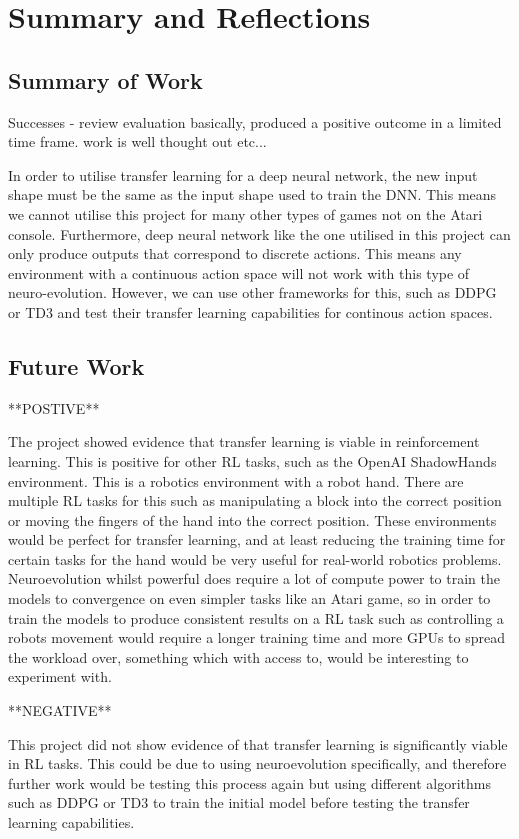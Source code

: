 \chapter{Summary and Reflections}

\label{ch:summary}

\section{Summary of Work}

Successes - review evaluation basically, produced a positive outcome in a limited time frame. work is well thought out etc...


In order to utilise transfer learning for a deep neural network, the new input shape must be the same as the input shape used to train the DNN. This means we cannot utilise this project for many other types of games not on the Atari console. Furthermore, deep neural network like the one utilised in this project can only produce outputs that correspond to discrete actions. This means any environment with a continuous action space will not work with this type of neuro-evolution. However, we can use other frameworks for this, such as DDPG or TD3 and test their transfer learning capabilities for continous action spaces.

\section{Future Work}

**POSTIVE**

The project showed evidence that transfer learning is viable in reinforcement learning. This is positive for other RL tasks, such as the OpenAI ShadowHands environment. This is a robotics environment with a robot hand. There are multiple RL tasks for this such as manipulating a block into the correct position or moving the fingers of the hand into the correct position. These environments would be perfect for transfer learning, and at least reducing the training time for certain tasks for the hand would be very useful for real-world robotics problems. Neuroevolution whilst powerful does require a lot of compute power to train the models to convergence on even simpler tasks like an Atari game, so in order to train the models to produce consistent results on a RL task such as controlling a robots movement would require a longer training time and more GPUs to spread the workload over, something which with access to, would be interesting to experiment with.

**NEGATIVE**

This project did not show evidence of that transfer learning is significantly viable in RL tasks. This could be due to using neuroevolution specifically, and therefore further work would be testing this process again but using different algorithms such as DDPG or TD3 to train the initial model before testing the transfer learning capabilities.
